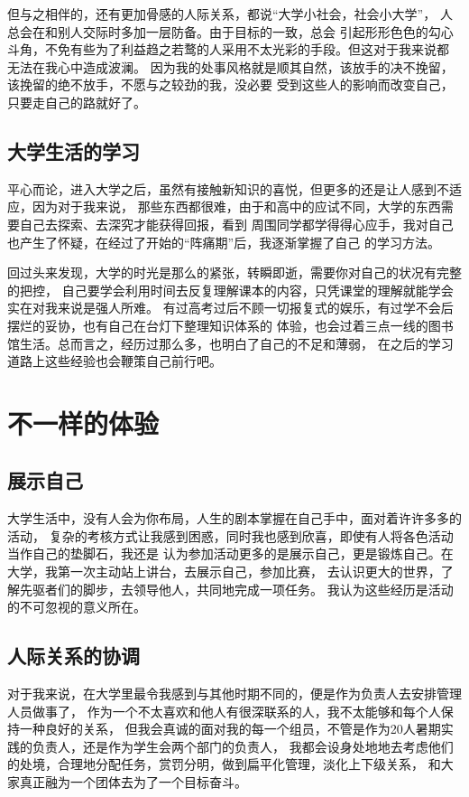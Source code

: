 \documentclass[AutoFakeBold]{LZUThesis}
\begin{document}
但与之相伴的，还有更加骨感的人际关系，都说“大学小社会，社会小大学”，
人总会在和别人交际时多加一层防备。由于目标的一致，总会
引起形形色色的勾心斗角，不免有些为了利益趋之若鹜的人采用不太光彩的手段。但这对于我来说都
无法在我心中造成波澜。
因为我的处事风格就是顺其自然，该放手的决不挽留，该挽留的绝不放手，不愿与之较劲的我，没必要
受到这些人的影响而改变自己，只要走自己的路就好了。

\subsection{大学生活的学习}
平心而论，进入大学之后，虽然有接触新知识的喜悦，但更多的还是让人感到不适应，因为对于我来说，
那些东西都很难，由于和高中的应试不同，大学的东西需要自己去探索、去深究才能获得回报，看到
周围同学都学得得心应手，我对自己也产生了怀疑，在经过了开始的“阵痛期”后，我逐渐掌握了自己
的学习方法。

回过头来发现，大学的时光是那么的紧张，转瞬即逝，需要你对自己的状况有完整的把控，
自己要学会利用时间去反复理解课本的内容，只凭课堂的理解就能学会实在对我来说是强人所难。
有过高考过后不顾一切报复式的娱乐，有过学不会后摆烂的妥协，也有自己在台灯下整理知识体系的
体验，也会过着三点一线的图书馆生活。总而言之，经历过那么多，也明白了自己的不足和薄弱，
在之后的学习道路上这些经验也会鞭策自己前行吧。


\section{不一样的体验}
\subsection{展示自己}
大学生活中，没有人会为你布局，人生的剧本掌握在自己手中，面对着许许多多的活动，
复杂的考核方式让我感到困惑，同时我也感到欣喜，即使有人将各色活动当作自己的垫脚石，我还是
认为参加活动更多的是展示自己，更是锻炼自己。在大学，我第一次主动站上讲台，去展示自己，参加比赛，
去认识更大的世界，了解先驱者们的脚步，去领导他人，共同地完成一项任务。
我认为这些经历是活动的不可忽视的意义所在。

\subsection{人际关系的协调}
对于我来说，在大学里最令我感到与其他时期不同的，便是作为负责人去安排管理人员做事了，
作为一个不太喜欢和他人有很深联系的人，我不太能够和每个人保持一种良好的关系，
但我会真诚的面对我的每一个组员，不管是作为20人暑期实践的负责人，还是作为学生会两个部门的负责人，
我都会设身处地地去考虑他们的处境，合理地分配任务，赏罚分明，做到扁平化管理，淡化上下级关系，
和大家真正融为一个团体去为了一个目标奋斗。
\end{document}
